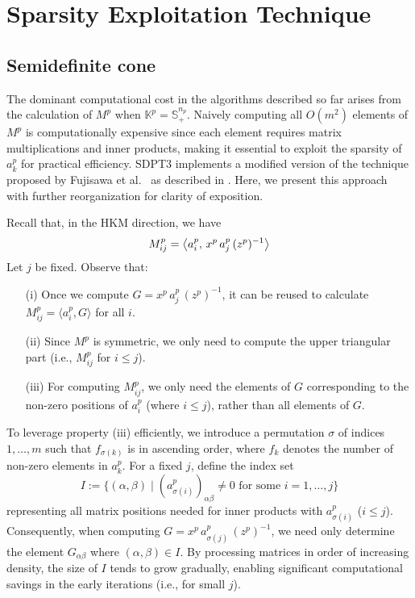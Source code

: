 \section{Sparsity Exploitation Technique} \label{sec:exploit_sparsity}
\subsection{Semidefinite cone} \label{sec:exploit_sparsity_sdp}
The dominant computational cost in the algorithms described so far arises from the calculation of $M^p$ when $\mathbb{K}^p = \mathbb{S}^{n_p}_+$. 
Naively computing all $O(m^2)$ elements of $M^p$ is computationally expensive since each element requires matrix multiplications and inner products, making it essential to exploit the sparsity of $a^p_k$ for practical efficiency. 
SDPT3 implements a modified version of the technique proposed by Fujisawa et al.~\cite{Fujisawa1997} as described in \cite{tutuncu2001}. 
Here, we present this approach with further reorganization for clarity of exposition.

\medskip

Recall that, in the HKM direction, we have
\[
  M^p_{ij}
  = \left\langle a^p_i, \, x^p\,a^p_j\,(z^p)^{-1} \right\rangle
\]
Let $j$ be fixed. Observe that:
\begin{enumerate}
\item[(i)] Once we compute $G = x^p\,a^p_j\,(z^p)^{-1}$, it can be reused to calculate $M^p_{ij} = \langle a^p_i, G \rangle$ for all $i$.
\item[(ii)] Since $M^p$ is symmetric, we only need to compute the upper triangular part (i.e., $M^p_{ij}$ for $i \leq j$).
\item[(iii)] For computing $M^p_{ij}$, we only need the elements of $G$ corresponding to the non-zero positions of $a^p_i$ (where $i \leq j$), rather than all elements of $G$.
\end{enumerate}

To leverage property (iii) efficiently, we introduce a permutation $\sigma$ of indices $1,\ldots,m$ such that $f_{\sigma(k)}$ is in ascending order, where $f_k$ denotes the number of non-zero elements in $a^p_k$.
For a fixed $j$, define the index set
\[
  I
  := \bigl\{(\alpha,\beta)\mid (a^p_{\sigma(i)})_{\alpha\beta}\neq 0
         \text{ for some } i=1,\ldots,j \bigr\}
\]
representing all matrix positions needed for inner products with $a^p_{\sigma(i)}$ ($i \leq j$).
Consequently, when computing $G = x^p\,a^p_{\sigma(j)}\,(z^p)^{-1}$, we need only determine the element $G_{\alpha\beta}$ where $(\alpha,\beta) \in I$. 
By processing matrices in order of increasing density, the size of $I$ tends to grow gradually, enabling significant computational savings in the early iterations (i.e., for small $j$).

